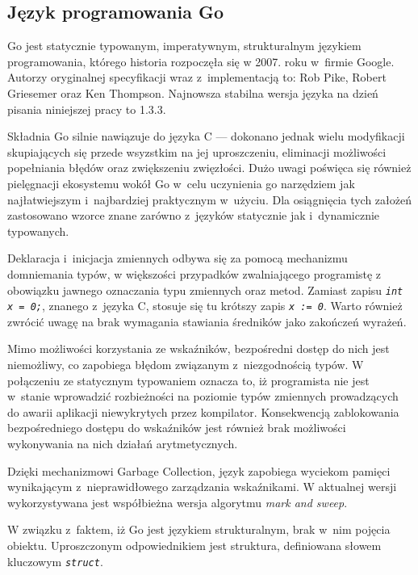 \subsection{Język programowania Go} %
\label{ss_internals_go}
\par{
Go jest statycznie typowanym, imperatywnym, strukturalnym językiem programowania, którego historia rozpoczęła się w 2007. roku w~firmie Google. Autorzy oryginalnej specyfikacji wraz z~implementacją to: Rob Pike, Robert Griesemer oraz Ken Thompson.
Najnowsza stabilna wersja języka na dzień pisania niniejszej pracy to 1.3.3.
}
\par{
Składnia Go silnie nawiązuje do języka C --- dokonano jednak wielu modyfikacji skupiających się przede wsyzstkim na jej uproszczeniu, eliminacji możliwości popełniania błędów oraz zwiększeniu zwięzłości.
Dużo uwagi poświęca się również pielęgnacji ekosystemu wokół Go w~celu uczynienia go narzędziem jak najłatwiejszym i~najbardziej praktycznym w~użyciu.
Dla osiągnięcia tych założeń zastosowano wzorce znane zarówno z~języków statycznie jak i~dynamicznie typowanych.
}
\par{Deklaracja i~inicjacja zmiennych odbywa się za pomocą mechanizmu domniemania typów, w większości przypadków zwalniającego programistę z obowiązku jawnego oznaczania typu zmiennych oraz metod. Zamiast zapisu \textit{\lstinline{int x = 0;}}, znanego z~języka C, stosuje się tu krótszy zapis \textit{\lstinline{x := 0}}. Warto również zwrócić uwagę na brak wymagania stawiania średników jako zakończeń wyrażeń.
}
 \par{Mimo możliwości korzystania ze wskaźników, bezpośredni dostęp do nich jest niemożliwy, co zapobiega błędom związanym z~niezgodnością typów. W połączeniu ze statycznym typowaniem oznacza to, iż programista nie jest w~stanie wprowadzić rozbieżności na poziomie typów zmiennych prowadzących do awarii aplikacji niewykrytych przez kompilator. Konsekwencją zablokowania bezpośredniego dostępu do wskaźników jest również brak możliwości wykonywania na nich działań arytmetycznych.
 }
 \par{
Dzięki mechanizmowi Garbage Collection, język zapobiega wyciekom pamięci wynikającym z~nieprawidłowego zarządzania wskaźnikami. W aktualnej wersji wykorzystywana jest współbieżna wersja algorytmu \textit{mark and sweep}.
}
\par{
 W związku z~faktem, iż Go jest językiem strukturalnym, brak w~nim pojęcia obiektu. Uproszczonym odpowiednikiem jest struktura, definiowana słowem kluczowym \textit{\lstinline{struct}}.
}
